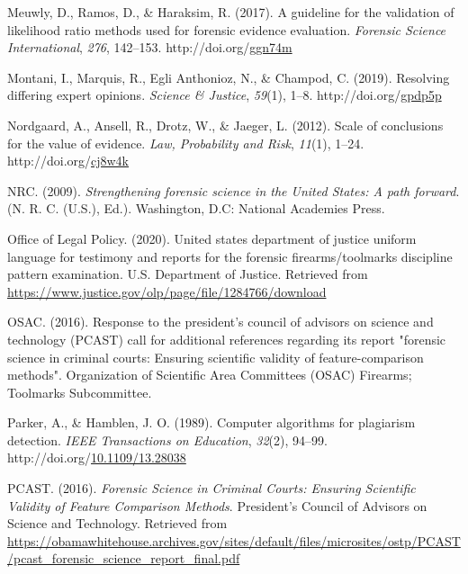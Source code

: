 \documentclass[print]{nuthesis}
\newlength{\cslhangindent}
\newenvironment{CSLReferences}[2]%
{\setlength{\parindent}{0pt}%
\everypar{\setlength{\hangindent}{\cslhangindent}}\ignorespaces}%
{\par}
\begin{document}
\begin{CSLReferences}{1}{0}
\leavevmode{}%
Meuwly, D., Ramos, D., \& Haraksim, R. (2017). A guideline for the validation of likelihood ratio methods used for forensic evidence evaluation. \emph{Forensic Science International}, \emph{276}, 142--153. http://doi.org/\href{https://doi.org/ggn74m}{ggn74m}

\leavevmode{}%
Montani, I., Marquis, R., Egli Anthonioz, N., \& Champod, C. (2019). Resolving differing expert opinions. \emph{Science \& Justice}, \emph{59}(1), 1--8. http://doi.org/\href{https://doi.org/gpdp5p}{gpdp5p}

\leavevmode{}%
Nordgaard, A., Ansell, R., Drotz, W., \& Jaeger, L. (2012). Scale of conclusions for the value of evidence. \emph{Law, Probability and Risk}, \emph{11}(1), 1--24. http://doi.org/\href{https://doi.org/cj8w4k}{cj8w4k}

\leavevmode{}%
NRC. (2009). \emph{Strengthening forensic science in the {United} {States}: A path forward}. (N. R. C. (U.S.), Ed.). Washington, D.C: National Academies Press.

\leavevmode{}%
Office of Legal Policy. (2020). United states department of justice uniform language for testimony and reports for the forensic firearms/toolmarks discipline pattern examination. U.S. Department of Justice. Retrieved from \url{https://www.justice.gov/olp/page/file/1284766/download}

\leavevmode{}%
OSAC. (2016). Response to the president's council of advisors on science and technology (PCAST) call for additional references regarding its report "forensic science in criminal courts: Ensuring scientific validity of feature-comparison methods". Organization of Scientific Area Committees (OSAC) Firearms; Toolmarks Subcommittee.

\leavevmode{}%
Parker, A., \& Hamblen, J. O. (1989). Computer algorithms for plagiarism detection. \emph{IEEE Transactions on Education}, \emph{32}(2), 94--99. http://doi.org/\href{https://doi.org/10.1109/13.28038}{10.1109/13.28038}

\leavevmode{}%
PCAST. (2016). \emph{Forensic {Science} in {Criminal} {Courts}: {Ensuring} {Scientific} {Validity} of {Feature} {Comparison} {Methods}}. {President's Council of Advisors on Science and Technology}. Retrieved from \url{https://obamawhitehouse.archives.gov/sites/default/files/microsites/ostp/PCAST/pcast_forensic_science_report_final.pdf}


\end{CSLReferences}
\end{document}

